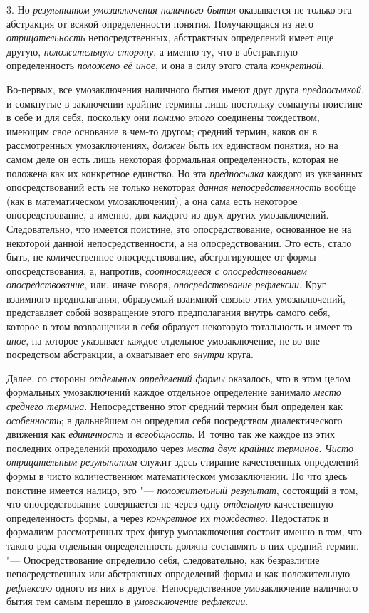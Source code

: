 3. Но {\em результатом
умозаключения наличного бытия} оказывается не только эта
абстракция от всякой определенности понятия. Получающаяся из него
{\em отрицательность}
непосредственных, абстрактных определений имеет еще другую,
{\em положительную сторону},
а именно ту, что в абстрактную определенность
{\em положено её иное},
и она в силу этого стала
{\em конкретной}.

Во-первых, все умозаключения наличного бытия имеют друг друга
{\em предпосылкой}, и
сомкнутые в заключении крайние термины лишь постольку сомкнуты поистине в
себе и для себя, поскольку они
{\em помимо этого}
соединены тождеством, имеющим свое основание в чем-то другом;
средний термин, каков он в рассмотренных умозаключениях,
{\em должен} быть их
единством понятия, но на самом деле он есть лишь некоторая формальная
определенность, которая не положена как их конкретное единство. Но эта
{\em предпосылка} каждого
из указанных опосредствований есть не только некоторая
{\em данная
}{\em непосредственность}
вообще (как в математическом умозаключении), а она сама есть
некоторое опосредствование, а именно, для каждого из двух других
умозаключений. Следовательно, что имеется поистине, это опосредствование,
основанное не на некоторой данной непосредственности, а на
опосредствовании. Это есть, стало быть, не количественное опосредствование,
абстрагирующее от формы опосредствования, а, напротив,
{\em соотносящееся с опосредствованием
опосредствование}, или, иначе говоря,
{\em опосредствование рефлексии}.
Круг взаимного предполагания, образуемый взаимной связью этих
умозаключений, представляет собой возвращение этого предполагания внутрь
самого себя, которое в этом возвращении в себя образует некоторую
тотальность и имеет то {\em иное},
на которое указывает каждое отдельное умозаключение, не
во-вне посредством абстракции, а охватывает его
{\em внутри} круга.

Далее, со стороны
{\em отдельных определений формы}
оказалось, что в этом целом формальных умозаключений каждое
отдельное определение занимало
{\em место среднего термина}.
Непосредственно этот средний термин был определен как
{\em особенность}; в
дальнейшем он определил себя посредством диалектического движения как
{\em единичность} и
{\em всеобщность}.
И~точно так же каждое из этих последних определений проходило через
{\em места двух крайних терминов}.
{\em Чисто отрицательным результатом}
служит здесь стирание качественных определений формы в чисто
количественном математическом умозаключении. Но что здесь поистине имеется
налицо, это "--- {\em положительный
результат}, состоящий в том, что опосредствование
совершается не через одну
{\em отдельную}
качественную определенность формы, а через
{\em конкретное} их
{\em тождество}.
Недостаток и формализм рассмотренных трех фигур умозаключения
состоит именно в том, что такого рода отдельная определенность должна
составлять в них средний термин. "--- Опосредствование
определило себя, следовательно, как безразличие непосредственных или
абстрактных определений формы и как положительную
{\em рефлексию} одного из
них в другое. \label{bkm:bm110b}Непосредственное
умозаключение наличного бытия тем самым перешло в
{\em умозаключение рефлексии}.

